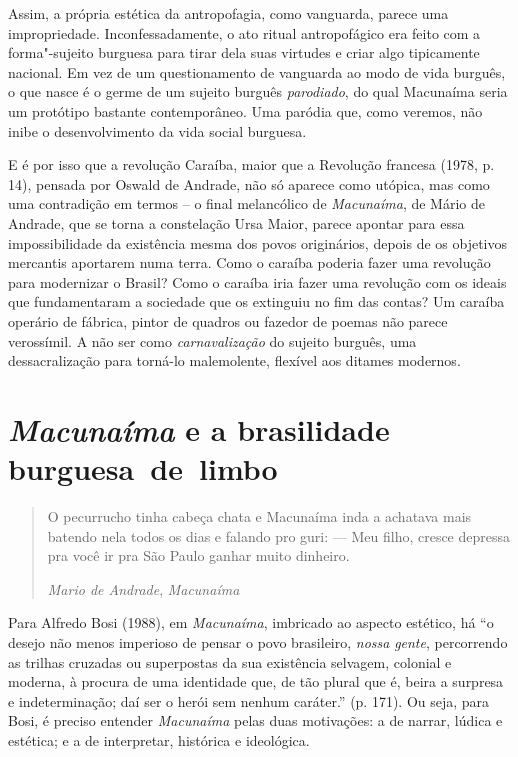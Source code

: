 {Assim, a própria estética da antropofagia, como vanguarda, parece uma
impropriedade. Inconfessadamente, o ato ritual antropofágico era feito
com a forma"-sujeito burguesa para tirar dela suas virtudes e criar algo
tipicamente nacional. Em vez de um questionamento de vanguarda ao modo
de vida burguês, o que nasce é o germe de um sujeito burguês
\emph{parodiado}, do qual Macunaíma seria um protótipo bastante
contemporâneo. Uma paródia que, como veremos, não inibe o
desenvolvimento da vida social burguesa.

E é por isso que a revolução Caraíba, maior que a Revolução francesa
(1978, p. 14), pensada por Oswald de Andrade, não só aparece como
utópica, mas como uma contradição em termos -- o final melancólico de
\emph{Macunaíma}, de Mário de Andrade, que se torna a constelação Ursa
Maior, parece apontar para essa impossibilidade da existência mesma dos
povos originários, depois de os objetivos mercantis aportarem numa
terra. Como o caraíba poderia fazer uma revolução para modernizar o
Brasil? Como o caraíba iria fazer uma revolução com os ideais que
fundamentaram a sociedade que os extinguiu no fim das contas? Um caraíba
operário de fábrica, pintor de quadros ou fazedor de poemas não parece
verossímil. A não ser como \emph{carnavalização} do sujeito burguês, uma
dessacralização para torná-lo malemolente, flexível aos ditames
modernos.

\section{\emph{Macunaíma} e a brasilidade burguesa~de~limbo}

\begin{quote}
O pecurrucho tinha cabeça chata e Macunaíma inda a achatava mais batendo
nela todos os dias e falando pro guri:
--- Meu filho, cresce depressa pra você ir pra São Paulo ganhar muito
  dinheiro.

\emph{Mario de Andrade}, \emph{Macunaíma}
\end{quote}

Para Alfredo Bosi (1988), em \emph{Macunaíma}, imbricado ao aspecto
estético, há ``o desejo não menos imperioso de pensar o povo brasileiro,
\emph{nossa} \emph{gente}, percorrendo as trilhas cruzadas ou
superpostas da sua existência selvagem, colonial e moderna, à procura de
uma identidade que, de tão plural que é, beira a surpresa e
indeterminação; daí ser o herói sem nenhum caráter.'' (p. 171). Ou seja,
para Bosi, é preciso entender \emph{Macunaíma} pelas duas motivações: a
de narrar, lúdica e estética; e a de interpretar, histórica e
ideológica.

}
